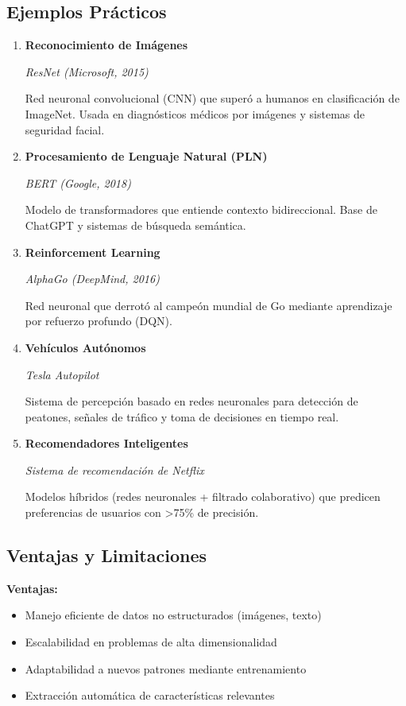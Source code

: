 \documentclass[14pt]{extarticle}
\begin{document}
  \subsection*{Ejemplos Prácticos}
  \begin{enumerate}
    \item \textbf{Reconocimiento de Imágenes}
    
      \textit{ResNet (Microsoft, 2015)}
      
      Red neuronal convolucional (CNN) que superó a humanos en clasificación de ImageNet. Usada en diagnósticos médicos por imágenes y sistemas de seguridad facial.

    \item \textbf{Procesamiento de Lenguaje Natural (PLN)}
    
      \textit{BERT (Google, 2018)}

      Modelo de transformadores que entiende contexto bidireccional. Base de ChatGPT y sistemas de búsqueda semántica.

    \item \textbf{Reinforcement Learning}
    
      \textit{AlphaGo (DeepMind, 2016)}
    
      Red neuronal que derrotó al campeón mundial de Go mediante aprendizaje por refuerzo profundo (DQN).

    \item \textbf{Vehículos Autónomos}
    
      \textit{Tesla Autopilot}
    
      Sistema de percepción basado en redes neuronales para detección de peatones, señales de tráfico y toma de decisiones en tiempo real.

    \item \textbf{Recomendadores Inteligentes}
    
      \textit{Sistema de recomendación de Netflix}
      
      Modelos híbridos (redes neuronales + filtrado colaborativo) que predicen preferencias de usuarios con >75\% de precisión.
  \end{enumerate}

  \subsection*{Ventajas y Limitaciones}

  \textbf{Ventajas:}
  \begin{itemize}
    \item Manejo eficiente de datos no estructurados (imágenes, texto)
    \item Escalabilidad en problemas de alta dimensionalidad
    \item Adaptabilidad a nuevos patrones mediante entrenamiento
    \item Extracción automática de características relevantes
  \end{itemize}
\end{document}
